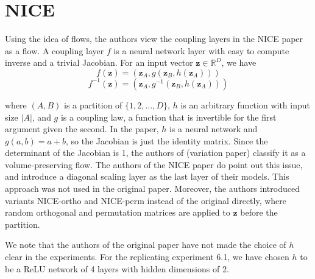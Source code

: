 \section{NICE}

Using the idea of flows, the authors view the coupling layers in the NICE paper as a flow. A coupling layer $f$ is a neural network layer with easy to compute inverse and a trivial Jacobian. For an input vector $\mathbf{z} \in \mathbb{R}^D$, we have
\begin{equation}
f(\mathbf{z}) = (\mathbf{z}_A, g(\mathbf{z}_B,h(\mathbf{z}_A))) 
\end{equation}
\begin{equation}
f^{-1}(\mathbf{z}) = (\mathbf{z}_A, g^{-1}(\mathbf{z}_B,h(\mathbf{z}_A)))
\end{equation}

where $(A,B)$ is a partition of $\{1,2,\dots,D\}$, $h$ is an arbitrary function with input size $|A|$, and $g$ is a coupling law, a function that is invertible for the first argument given the second. In the paper, $h$ is a neural network and $g(a,b)=a+b$, so the Jacobian is just the identity matrix. Since the determinant of the Jacobian is 1, the authors of (variation paper) classify it as a volume-preserving flow.
The authors of the NICE paper \cite{nice} do point out this issue, and introduce a diagonal scaling layer as the last layer of their models. This approach was not used in the original paper. Moreover, the authors introduced variants NICE-ortho and NICE-perm instead of the original directly, where random orthogonal and permutation matrices are applied to $\mathbf{z}$ before the partition. 

We note that the authors of the original paper have not made the choice of $h$ clear in the experiments. For the replicating experiment 6.1, we have chosen $h$ to be a ReLU network of 4 layers with hidden dimensions of 2.